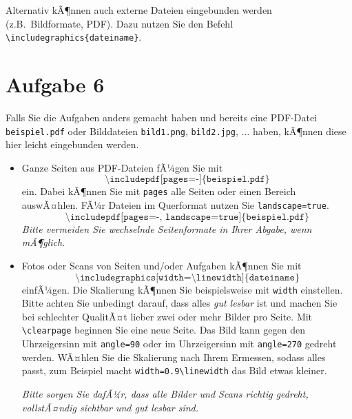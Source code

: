 \documentclass[a4paper, 11pt]{article}
\begin{document}
Alternativ kÃ¶nnen auch externe Dateien eingebunden werden (z.B.\ Bildformate, PDF).
Dazu nutzen Sie den Befehl \texttt{\textbackslash includegraphics\{dateiname\}}.



\section*{Aufgabe 6}

Falls Sie die Aufgaben anders gemacht haben
und bereits eine PDF-Datei \texttt{beispiel.pdf}
oder Bilddateien \texttt{bild1.png}, \texttt{bild2.jpg}, $\ldots$
haben, kÃ¶nnen diese hier leicht eingebunden werden.

\begin{itemize}
\item Ganze Seiten aus PDF-Dateien fÃ¼gen Sie mit
\[
\texttt{\textbackslash includepdf[pages=-]\{beispiel.pdf\}}
\]
ein. Dabei kÃ¶nnen Sie mit \texttt{pages} alle Seiten
oder einen Bereich auswÃ¤hlen.
FÃ¼r Dateien im Querformat nutzen Sie \texttt{landscape=true}.
\[
\texttt{\textbackslash includepdf[pages=-, landscape=true]\{beispiel.pdf\}}
\]
\emph{Bitte vermeiden Sie wechselnde Seitenformate in Ihrer Abgabe, wenn mÃ¶glich.}

\item Fotos oder Scans von Seiten und/oder Aufgaben kÃ¶nnen Sie mit
\[
\texttt{\textbackslash includegraphics[width=\textbackslash linewidth]\{dateiname\}}
\]
einfÃ¼gen. Die Skalierung kÃ¶nnen Sie beispielsweise mit \texttt{width} einstellen.
Bitte achten Sie unbedingt darauf, dass alles \emph{gut lesbar} ist
und machen Sie bei schlechter QualitÃ¤t lieber zwei oder mehr Bilder pro Seite.
Mit \texttt{\textbackslash clearpage} beginnen Sie eine neue Seite.
Das Bild kann gegen den Uhrzeigersinn mit \texttt{angle=90} oder
im Uhrzeigersinn mit \texttt{angle=270} gedreht werden.
WÃ¤hlen Sie die Skalierung nach Ihrem Ermessen, sodass alles passt,
zum Beispiel macht \texttt{width=0.9\textbackslash linewidth} das Bild etwas kleiner.

\emph{Bitte sorgen Sie dafÃ¼r, dass alle Bilder und Scans richtig gedreht, vollstÃ¤ndig sichtbar und gut lesbar sind.}
\end{itemize}

%
%







\end{document}

